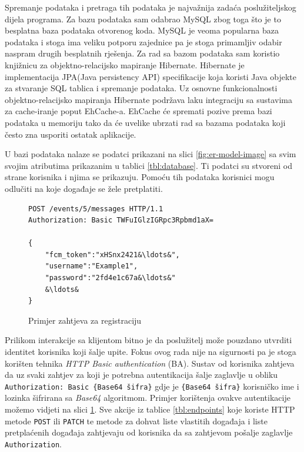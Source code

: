 \documentclass[times, utf8, zavrsni]{fer}
\begin{document}
{Spremanje podataka i pretraga tih podataka je najvažnija zadaća poslužiteljskog dijela programa. Za bazu podataka sam odabrao MySQL zbog toga što je to besplatna baza podataka otvorenog koda. MySQL je veoma popularna baza podataka i stoga ima veliku potporu zajednice pa je stoga primamljiv odabir naspram drugih besplatnih rješenja. Za rad sa bazom podataka sam koristio knjižnicu za objektno-relacijsko mapiranje Hibernate. Hibernate je implementacija JPA(Java persistency API) specifikacije koja koristi Java objekte za stvaranje SQL tablica i spremanje podataka. Uz osnovne funkcionalnosti objektno-relacijsko mapiranja Hibernate podržava laku integraciju sa sustavima za cache-iranje poput EhCache-a. EhCache će spremati pozive prema bazi podataka u memoriju tako da će uvelike ubrzati rad sa bazama podataka koji često zna usporiti ostatak aplikacije.

U bazi podataka nalaze se podatci prikazani na slici \ref{fig:er-model-image} sa svim svojim atributima prikazanim u tablici \ref{tbl:database}. Ti podatci su stvoreni od strane korisnika i njima se prikazuju. Pomoću tih podataka korisnici mogu odlučiti na koje događaje se žele pretplatiti.

\begin{figure}[htb]
\begin{lstlisting}
POST /events/5/messages HTTP/1.1
Authorization: Basic TWFuIGlzIGRpc3Rpbmd1aX=

{
	"fcm_token":"xHSnx2421&\ldots&",
	"username":"Example1",
	"password":"2fd4e1c67a&\ldots&"
	&\ldots&
}
\end{lstlisting}
\caption{Primjer zahtjeva za registraciju}
\label{lst:register-request}
\end{figure}

Prilikom interakcije sa klijentom bitno je da poslužitelj može pouzdano utvrditi identitet korisnika koji šalje upite. Fokus ovog rada nije na sigurnosti pa je stoga korišten tehnika {\em HTTP Basic authentication} (BA). Sustav od korisnika zahtjeva da uz svaki zahtjev za koji je potrebna autentikacija šalje zaglavlje u obliku {\tt Authorization: Basic \{Base64 šifra\}} gdje je {\tt \{Base64 šifra\}} korisničko ime i lozinka šifrirana sa {\em Base64} algoritmom. Primjer korištenja ovakve autentikacije možemo vidjeti na slici \ref{lst:register-request}. Sve akcije iz tablice \ref{tbl:endpoints} koje koriste HTTP metode {\tt POST} ili {\tt PATCH} te metode za dohvat liste vlastitih događaja i liste pretplaćenih događaja zahtjevaju od korisnika da sa zahtjevom pošalje zaglavlje {\tt Authorization}.

}
\end{document}
